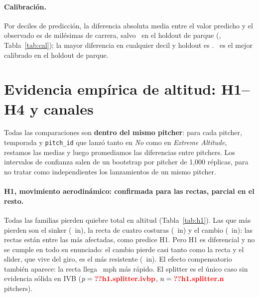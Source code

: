 \documentclass[10pt]{article}
\begin{document}
\begin{table}[htbp]\centering\small
\caption{Reducción relativa de log-loss frente al baseline nulo, por target y holdout (positivo = mejor).}\label{tab:logloss}
\end{table}

\paragraph{Calibración.} Por deciles de predicción, la diferencia absoluta media entre el valor predicho y el observado es de milésimas de carrera, salvo \splus\ en el holdout de parque (, Tabla~\ref{tab:cal}); la mayor diferencia en cualquier decil y holdout es . \pplus\ es el mejor calibrado en el holdout de parque.

\begin{table}[htbp]\centering\small
\caption{Error de calibración por deciles (carreras por pitcheo): media y máximo de $|\bar y_{\text{pred}}-\bar y_{\text{obs}}|$.}\label{tab:cal}
\end{table}

\section{Evidencia empírica de altitud: H1--H4 y canales}
\label{sec:altitud}

Todas las comparaciones son \textbf{dentro del mismo pitcher}: para cada pitcher, temporada y \texttt{pitch\_id} que lanzó tanto en \emph{No} como en \emph{Extreme Altitude}, restamos las medias y luego promediamos las diferencias entre pitchers. Los intervalos de confianza salen de un bootstrap por pitcher de 1{,}000 réplicas, para no tratar como independientes los lanzamientos de un mismo pitcher.

\paragraph{H1, movimiento aerodinámico: confirmada para las rectas, parcial en el resto.} Todas las familias pierden quiebre total en altitud (Tabla~\ref{tab:h1}). Las que más pierden son el sinker (~in), la recta de cuatro costuras (~in) y el cambio (~in): las rectas están entre las más afectadas, como predice H1. Pero H1 es diferencial y no se cumple en todo su enunciado: el cambio pierde casi tanto como la recta y el slider, que vive del giro, es el más resistente (~in). El efecto compensatorio también aparece: la recta llega ~mph más rápido. El splitter es el único caso sin evidencia sólida en IVB ($p=\cf{h1.splitter.ivbp}$, $n=\cf{h1.splitter.n}$ pitchers).
\end{document}
